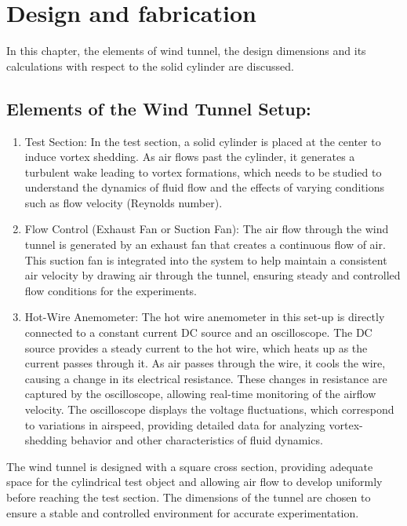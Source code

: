 \chapter{Design and fabrication}\label{ch:design}

In this chapter, the elements of wind tunnel, the design dimensions and its calculations with respect to the solid cylinder are discussed.
\section{Elements of the Wind Tunnel Setup:}

\begin{enumerate}

\item Test Section: In the test section, a solid cylinder is placed at the center to induce vortex shedding. As air flows past the cylinder, it generates a turbulent wake leading to vortex formations, which needs to be studied to understand the dynamics of fluid flow and the effects of varying conditions such as flow velocity (Reynolds number).

\item Flow Control (Exhaust Fan or Suction Fan): The air flow through the wind tunnel is generated by an exhaust fan that creates a continuous flow of air. This suction fan is integrated into the system to help maintain a consistent air velocity by drawing air through the tunnel, ensuring steady and controlled flow conditions for the experiments.

\item Hot-Wire Anemometer: The hot wire anemometer in this set-up is directly connected to a constant current DC source and an oscilloscope. The DC source provides a steady current to the hot wire, which heats up as the current passes through it. As air passes through the wire, it cools the wire, causing a change in its electrical resistance. These changes in resistance are captured by the oscilloscope, allowing real-time monitoring of the airflow velocity. The oscilloscope displays the voltage fluctuations, which correspond to variations in airspeed, providing detailed data for analyzing vortex-shedding behavior and other characteristics of fluid dynamics.

\end{enumerate}
The wind tunnel is designed with a square cross section, providing adequate space for the cylindrical test object and allowing air flow to develop uniformly before reaching the test section. The dimensions of the tunnel are chosen to ensure a stable and controlled environment for accurate experimentation.


